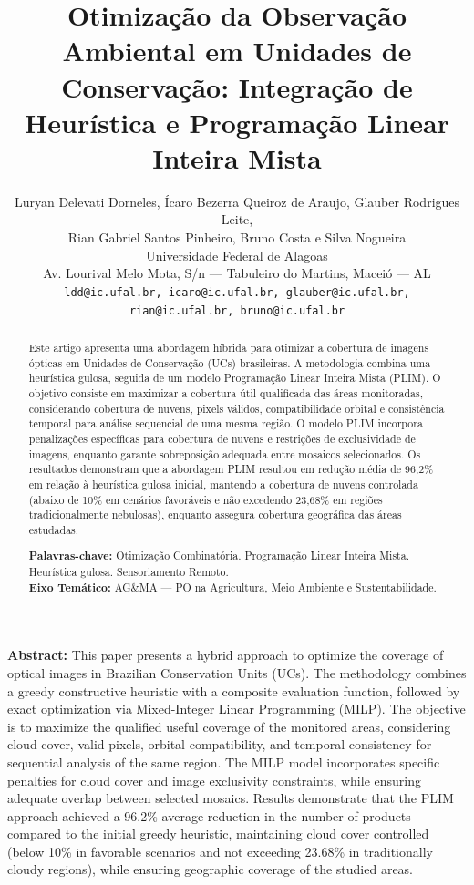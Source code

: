\documentclass[a4paper,11pt]{article}
\title{\textbf{\Large Otimização da Observação Ambiental em Unidades de Conservação: Integração de Heurística e Programação Linear Inteira Mista}}%
\author{%
Luryan Delevati Dorneles, Ícaro Bezerra Queiroz de Araujo, Glauber Rodrigues Leite,\\
 Rian Gabriel Santos Pinheiro, Bruno Costa e Silva Nogueira\\[2mm]
Universidade Federal de Alagoas\\
Av. Lourival Melo Mota, S/n --- Tabuleiro do Martins, Maceió --- AL\\
\texttt{ldd@ic.ufal.br, icaro@ic.ufal.br, glauber@ic.ufal.br,}\\
\texttt{rian@ic.ufal.br, bruno@ic.ufal.br}
}
\date{}
\let\oldmaketitle\maketitle
\renewcommand{\maketitle}{%
  \oldmaketitle%
  \thispagestyle{fancy}
}
\begin{document}
\vspace{-5mm}
\maketitle
\vspace{-8mm}
\begin{abstract}
    Este artigo apresenta uma abordagem híbrida para otimizar a cobertura de imagens ópticas em Unidades de Conservação (UCs) brasileiras. A metodologia combina uma heurística gulosa, seguida de um modelo Programação Linear Inteira Mista (PLIM). O objetivo consiste em maximizar a cobertura útil qualificada das áreas monitoradas, considerando cobertura de nuvens, pixels válidos, compatibilidade orbital e consistência temporal para análise sequencial de uma mesma região. O modelo PLIM incorpora penalizações específicas para cobertura de nuvens e restrições de exclusividade de imagens, enquanto garante sobreposição adequada entre mosaicos selecionados. Os resultados demonstram que a abordagem PLIM resultou em redução média de 96,2\% em relação à heurística gulosa inicial, mantendo a cobertura de nuvens controlada (abaixo de 10\% em cenários favoráveis e não excedendo 23,68\% em regiões tradicionalmente nebulosas), enquanto assegura cobertura geográfica das áreas estudadas.

    \bigskip
    \noindent
    \textbf{Palavras-chave:} Otimização Combinatória. Programação Linear Inteira Mista. Heurística gulosa. Sensoriamento Remoto.\\
    \noindent\textbf{Eixo Temático:} AG\&MA --- PO na Agricultura, Meio Ambiente e Sustentabilidade.
    \end{abstract}
    
    \bigskip
\vspace{-8mm}
    
    \bigskip
    
\noindent\textbf{Abstract:} 
    This paper presents a hybrid approach to optimize the coverage of optical images in Brazilian Conservation Units (UCs). The methodology combines a greedy constructive heuristic with a composite evaluation function, followed by exact optimization via Mixed-Integer Linear Programming (MILP). The objective is to maximize the qualified useful coverage of the monitored areas, considering cloud cover, valid pixels, orbital compatibility, and temporal consistency for sequential analysis of the same region. The MILP model incorporates specific penalties for cloud cover and image exclusivity constraints, while ensuring adequate overlap between selected mosaics. Results demonstrate that the PLIM approach achieved a 96.2\% average reduction in the number of products compared to the initial greedy heuristic, maintaining cloud cover controlled (below 10\% in favorable scenarios and not exceeding 23.68\% in traditionally cloudy regions), while ensuring geographic coverage of the studied areas.
\end{document}
